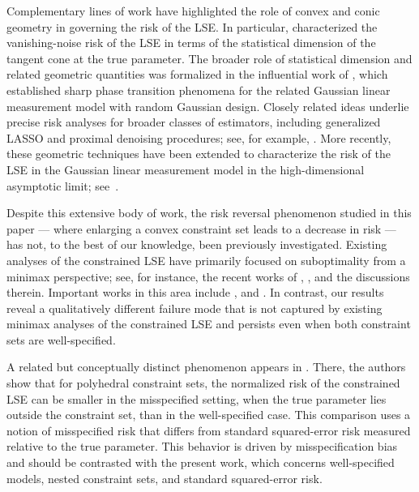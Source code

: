 \documentclass[11pt]{article}
\theoremstyle{plain}
\theoremstyle{definition}
\begin{document}
Complementary lines of work have highlighted the role of convex and conic geometry in governing the risk of the LSE. In particular, \cite{oymak2016sharp} characterized the vanishing-noise risk of the LSE in terms of the statistical dimension of the tangent cone at the true parameter. The broader role of statistical dimension and related geometric quantities was formalized in the influential work of \cite{amelunxen2014living}, which established sharp phase transition phenomena for the related Gaussian linear measurement model with random Gaussian design. Closely related ideas underlie precise risk analyses for broader classes of estimators, including generalized LASSO and proximal denoising procedures; see, for example, \cite{oymak2013squared}. More recently, these geometric techniques have been extended to characterize the risk of the LSE in the Gaussian linear measurement model in the high-dimensional asymptotic limit; see~\cite{han2023noisy}.

Despite this extensive body of work, the risk reversal phenomenon studied in this paper --- where enlarging a convex constraint set leads to a decrease in risk --- has not, to the best of our knowledge, been previously investigated. Existing analyses of the constrained LSE have primarily focused on suboptimality from a minimax perspective; see, for instance, the recent works of \cite{prasadan2025some}, \cite{aolaritei2025revisiting}, \cite{Matey23} and the discussions therein. Important works in this area include \cite{birge1993rates, kur2020suboptimality, kur2023variance, kur2024convex}, and \cite{zhang2013nearly}. In contrast, our results reveal a qualitatively different failure mode that is not captured by existing minimax analyses of the constrained LSE and persists even when both constraint sets are well-specified.

A related but conceptually distinct phenomenon appears in \cite{fang2019risk}. There, the authors show that for polyhedral constraint sets, the normalized risk of the constrained LSE can be smaller in the misspecified setting, when the true parameter lies outside the constraint set, than in the well-specified case. This comparison uses a notion of misspecified risk that differs from standard squared-error risk measured relative to the true parameter. This behavior is driven by misspecification bias and should be contrasted with the present work, which concerns well-specified models, nested constraint sets, and standard squared-error risk.
\end{document}
